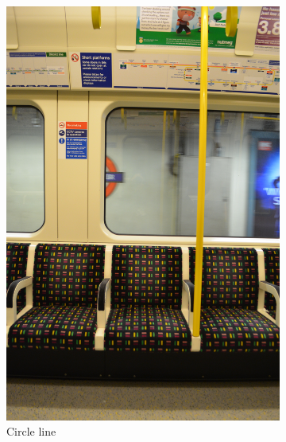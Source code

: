 \begin{figure}[H]
    \centering
    \begin{subfigure}[b]{0.22\textwidth}
        \centering
        \includegraphics[width=\textwidth]{guidance-example-section/images/rathbone2017circle.jpg}
        \caption{Circle line \parencite{rathbone2017circle}}
        \label{fig:rathbone2017circle}
    \end{subfigure}
    \hfill
    \begin{subfigure}[b]{0.22\textwidth}
        \centering

\end{subfigure}
\end{figure}
